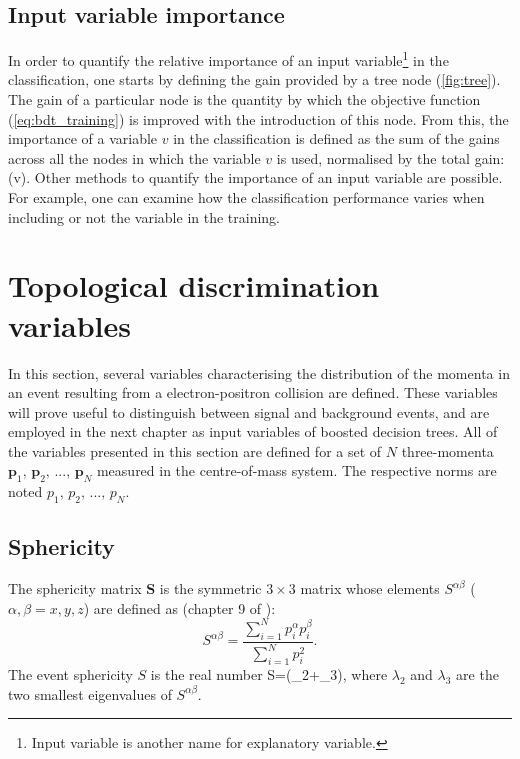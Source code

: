 \subsection{Input variable importance} \label{sec:da_variable_importance}
In order to quantify the relative importance of an input variable\footnote{Input variable is another name for explanatory variable.} in the classification, one starts by defining the gain provided by a tree node (\cref{fig:tree}).
The gain of a particular node is the quantity by which the objective function (\cref{eq:bdt_training}) is improved with the introduction of this node.
From this, the importance of a variable $v$ in the classification is defined as the sum of the gains across all the nodes in which the variable $v$ is used, normalised by the total gain:
\be \label{eq:importance}
(v)\equiv{}.
\ee
Other methods to quantify the importance of an input variable are possible.
For example, one can examine how the classification performance varies when including or not the variable in the training.
\section{Topological discrimination variables} \label{sec:da_variables}

In this section, several variables characterising the distribution of the momenta in an event resulting from a electron-positron collision are defined.
These variables will prove useful to distinguish between signal and background events, and are employed in the next chapter as input variables of boosted decision trees.
All of the variables presented in this section are defined for a set of $N$ three-momenta ${\mathbf{p}_1,\,\mathbf{p}_2,\,...,\,\mathbf{p}_N}$ measured in the centre-of-mass system.
The respective norms are noted ${p_1,\,p_2,\,...,\,p_N}$.

\subsection{Sphericity} \label{sec:sphericity}
The sphericity matrix $\mathbf{S}$ is the symmetric $3\times 3$ matrix whose elements $S^{\alpha\beta}$ ($\alpha,\beta=x,y,z$) are defined as (chapter 9 of \autocite{BaBar:2014omp}):
\begin{equation}
S^{\alpha\beta}=\frac{\sum\limits_{i=1}^{N} p_i^\alpha p_i^\beta}{\sum\limits_{i=1}^{N} p_i^2}.
\end{equation}
The event sphericity $S$ is the real number
\be
S=(\lambda_2+\lambda_3),
\ee
where $\lambda_2$ and $\lambda_3$ are the two smallest eigenvalues of $S^{\alpha\beta}$.

